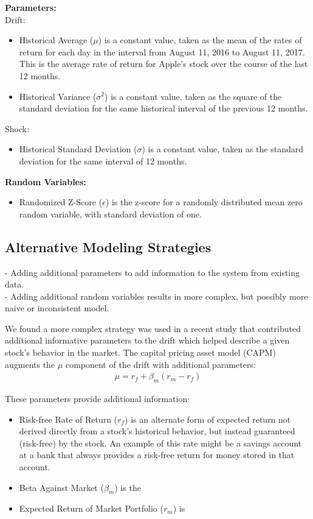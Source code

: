 \documentclass{article}
\begin{document}
\noindent\textbf{Parameters:}\\
Drift:
\begin{itemize}
\item Historical Average ($\mu$) is a constant value, taken as the mean of the rates of return for each day in the interval from August 11, 2016 to August 11, 2017. This is the average rate of return for Apple's stock over the course of the last 12 months.
\item Historical Variance ($\sigma ^{2}$) is a constant value, taken as the square of the standard deviation for the same historical interval of the previous 12 months.
\end{itemize}
Shock:
\begin{itemize}
\item Historical Standard Deviation ($\sigma$) is a constant value, taken as the standard deviation for the same interval of 12 months.\\
\end{itemize}

\noindent\textbf{Random Variables:}\\
\begin{itemize}
\item Randomized Z-Score ($\epsilon$) is the z-score for a randomly distributed mean zero random variable, with standard deviation of one.
\end{itemize}

\subsection{Alternative Modeling Strategies}
- Adding additional parameters to add information to the system from existing data. \\
- Adding additional random variables results in more complex, but possibly more naive or inconsistent model.

We found a more complex strategy was used in a recent study that contributed additional informative parameters to the drift which helped describe a given stock's behavior in the market. The capital pricing asset model (CAPM) augments the $\mu$ component of the drift with additional parameters:
\begin{align*}
\mu = r_{f} + \beta_{m}(r_{m} - r_{f})
\end{align*}

\noindent These parameters provide additional information:
\begin{itemize}
\item Risk-free Rate of Return ($r_{f}$) is an alternate form of expected return not derived directly from a stock's historical behavior, but instead guaranteed (risk-free) by the stock. An example of this rate might be a savings account at a bank that always provides a risk-free return for money stored in that account.
\item Beta Against Market ($\beta_{m}$) is the 
\item Expected Return of Market Portfolio ($r_{m}$) is 
\end{itemize}
\end{document}
